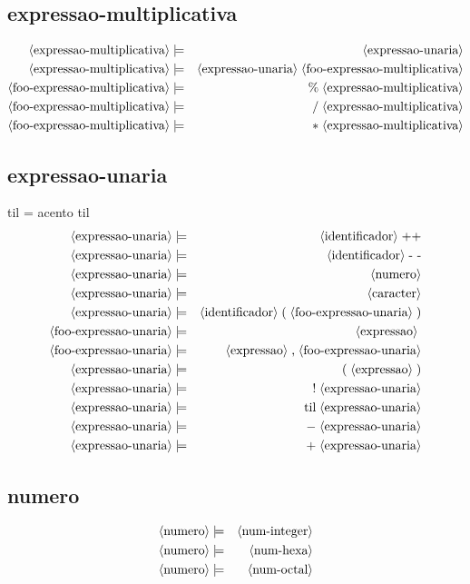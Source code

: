\documentclass[12pt,a4papper]{article}
\newcommand{\pn}[1]{\langle \textnormal{#1} \rangle}
\newcommand{\pp}{\models}
\newcommand{\ww}{\;}
\newcommand{\sm}[1]{\textnormal{#1}}
\begin{document}
\begin{landscape}
\subsection{expressao-multiplicativa}
\begin{eqnarray}
        \pn{expressao-multiplicativa} &\pp& \pn{expressao-unaria} \\
        \pn{expressao-multiplicativa} &\pp& \pn{expressao-unaria} \ww \pn{foo-expressao-multiplicativa} \\
    \pn{foo-expressao-multiplicativa} &\pp& \sm{\%} \ww \pn{expressao-multiplicativa} \\
        \pn{foo-expressao-multiplicativa} &\pp& \sm{/} \ww \pn{expressao-multiplicativa} \\
        \pn{foo-expressao-multiplicativa} &\pp& \sm{$*$} \ww \pn{expressao-multiplicativa}
\end{eqnarray}



\subsection{expressao-unaria}
til = acento til
\begin{eqnarray}
        \pn{expressao-unaria} &\pp& \pn{identificador}  \ww  \sm{++} \\
        \pn{expressao-unaria} &\pp& \pn{identificador}  \ww  \sm{- -} \\
        \pn{expressao-unaria} &\pp& \pn{numero} \\
        \pn{expressao-unaria} &\pp& \pn{caracter} \\
        \pn{expressao-unaria} &\pp& \pn{identificador} \ww \sm{(} \ww \pn{foo-expressao-unaria} \ww \sm{)} \\
   \pn{foo-expressao-unaria}  &\pp& \pn{expressao} \ww \\
   \pn{foo-expressao-unaria}  &\pp& \pn{expressao} \ww \sm{,} \ww \pn{foo-expressao-unaria} \\
       \pn{expressao-unaria}  &\pp& \sm{(}  \ww   \pn{expressao}   \ww  \sm{)} \\
       \pn{expressao-unaria}  &\pp& \sm{!}  \ww  \pn{expressao-unaria} \\
       \pn{expressao-unaria}  &\pp& \sm{til}  \ww  \pn{expressao-unaria} \\
       \pn{expressao-unaria}  &\pp& \sm{$-$}  \ww  \pn{expressao-unaria} \\
       \pn{expressao-unaria}  &\pp& \sm{$+$}  \ww  \pn{expressao-unaria} 
      \end{eqnarray}


\subsection{numero}
\begin{eqnarray}
        \pn{numero} &\pp& \pn{num-integer} \\
        \pn{numero} &\pp& \pn{num-hexa} \\
        \pn{numero} &\pp& \pn{num-octal} 
\end{eqnarray}

\end{landscape}
\end{document}

